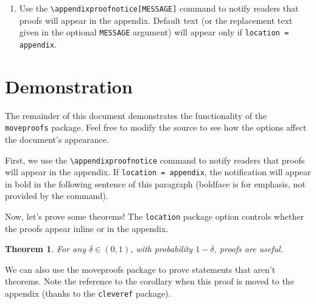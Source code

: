 \documentclass{article}
\newtheorem{theorem}{Theorem}
\begin{document}
\begin{enumerate}
\begin{itemize}
            \begin{itemize}
            \item \texttt{\textbackslash appendixproofsection\{Section Name\}}: creates a section in the appendix that appears only if \texttt{location = appendix}.
            \item \texttt{\textbackslash appendixproof\{theorem\_label\}}: Inserts the proof you wrote inside \texttt{\textbackslash makeproof\{theorem\_label\}} (again, only if \texttt{location = appendix}).
            \end{itemize}
        \end{itemize}
    \item Use the \texttt{\textbackslash appendixproofnotice[MESSAGE]} command to notify readers that proofs will appear in the appendix. Default text (or the replacement text given in the optional \texttt{MESSAGE} argument) will appear only if \texttt{location = appendix}.
\end{enumerate}

\section{Demonstration}
The remainder of this document demonstrates the functionality of the \texttt{moveproofs} package.
Feel free to modify the source to see how the options affect the document's appearance.

First, we use the \texttt{\textbackslash appendixproofnotice} command to notify readers that proofs will appear in the appendix. If \texttt{location = appendix}, the notification will appear in bold in the following sentence of this paragraph (boldface is for emphasis, not provided by the command). \textbf{}

Now, let's prove some theorems! The \texttt{location} package option controls whether the proofs appear inline or in the appendix.

\begin{theorem}\label{theorem_one}
For any $\delta \in (0, 1)$, with probability $1 - \delta$, proofs are useful.
\end{theorem}


\noindent We can also use the moveproofs package to prove statements that aren't theorems.
Note the reference to the corollary when this proof is moved to the appendix (thanks to the \texttt{cleveref} package).
\end{document}

